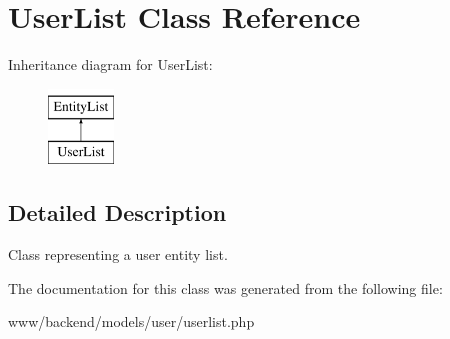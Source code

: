 \hypertarget{classUserList}{
\section{UserList Class Reference}
\label{classUserList}
}
Inheritance diagram for UserList:\begin{figure}[H]
\begin{center}
\leavevmode
\includegraphics[height=2.000000cm]{classUserList}
\end{center}
\end{figure}


\subsection{Detailed Description}
Class representing a user entity list. 

The documentation for this class was generated from the following file:\begin{DoxyCompactItemize}
\item 
www/backend/models/user/userlist.php\end{DoxyCompactItemize}
